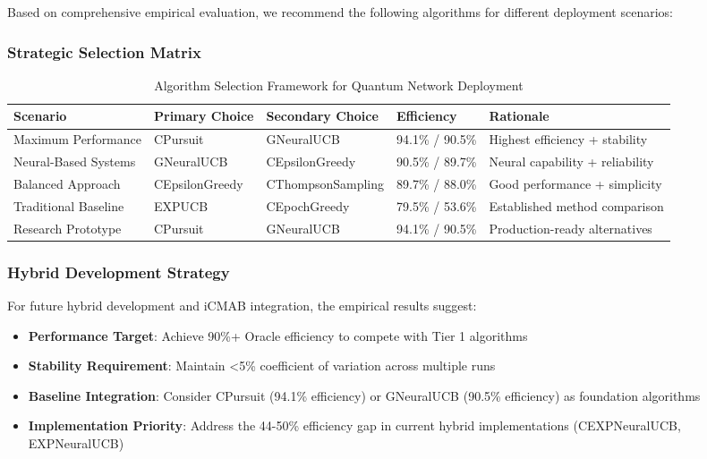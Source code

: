 \documentclass[12pt,a4paper]{article}
\begin{document}
Based on comprehensive empirical evaluation, we recommend the following algorithms for different deployment scenarios:

\subsubsection{Strategic Selection Matrix}

\begin{table}[H]
\centering
\caption{Algorithm Selection Framework for Quantum Network Deployment}
\begin{tabular}{|l|l|l|l|l|}
\hline
\textbf{Scenario} & \textbf{Primary Choice} & \textbf{Secondary Choice} & \textbf{Efficiency} & \textbf{Rationale} \\
\hline
\hline
Maximum Performance & CPursuit & GNeuralUCB & 94.1\% / 90.5\% & Highest efficiency + stability \\
Neural-Based Systems & GNeuralUCB & CEpsilonGreedy & 90.5\% / 89.7\% & Neural capability + reliability \\
Balanced Approach & CEpsilonGreedy & CThompsonSampling & 89.7\% / 88.0\% & Good performance + simplicity \\
Traditional Baseline & EXPUCB & CEpochGreedy & 79.5\% / 53.6\% & Established method comparison \\
Research Prototype & CPursuit & GNeuralUCB & 94.1\% / 90.5\% & Production-ready alternatives \\
\hline
\end{tabular}
\end{table}

\subsubsection{Hybrid Development Strategy}

For future hybrid development and iCMAB integration, the empirical results suggest:

\begin{itemize}
\item \textbf{Performance Target}: Achieve 90\%+ Oracle efficiency to compete with Tier 1 algorithms
\item \textbf{Stability Requirement}: Maintain <5\% coefficient of variation across multiple runs
\item \textbf{Baseline Integration}: Consider CPursuit (94.1\% efficiency) or GNeuralUCB (90.5\% efficiency) as foundation algorithms
\item \textbf{Implementation Priority}: Address the 44-50\% efficiency gap in current hybrid implementations (CEXPNeuralUCB, EXPNeuralUCB)
\end{itemize}
\end{document}
